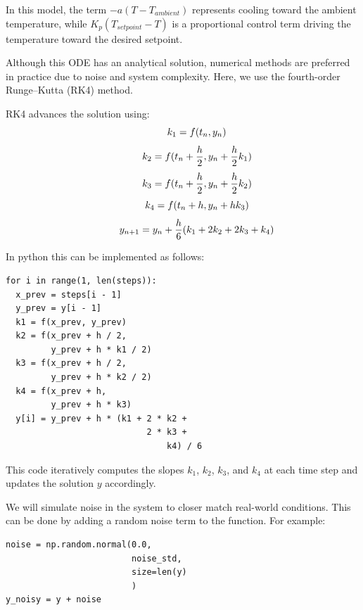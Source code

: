 \documentclass[letterpaper,twocolumn,fleqn]{article}
\begin{document}
In this model, the term $-a(T - T_{ambient})$ represents cooling toward the ambient temperature, while $K_{p}(T_{setpoint} - T)$ is a proportional control term driving the temperature toward the desired setpoint.
\vspace{0.1in}

\noindent Although this ODE has an analytical solution, numerical methods are preferred in practice due to noise and system complexity. Here, we use the fourth-order Runge–Kutta (RK4) method.
\vspace{0.1in}

\noindent RK4 advances the solution using: 
\[\hspace{0.4in}
k_1 = f(t_n, y_n)
\]
\[\hspace{0.4in}
k_2 = f(t_n + \frac{h}{2}, y_n + \frac{h}{2}k_1)
\]
\[\hspace{0.4in}
k_3 = f(t_n + \frac{h}{2}, y_n + \frac{h}{2}k_2)
\]
\[\hspace{0.4in}
k_4 = f(t_n + h, y_n + hk_3)
\]
\[\hspace{0.4in}
y_{n+1} = y_n + \frac{h}{6}(k_1 + 2k_2 + 2k_3 + k_4)
\]

\noindent In python this can be implemented as follows:
\begin{center}
\begin{minipage}{0.75\linewidth} %
\begin{verbatim}
for i in range(1, len(steps)):
  x_prev = steps[i - 1]
  y_prev = y[i - 1]
  k1 = f(x_prev, y_prev)
  k2 = f(x_prev + h / 2, 
         y_prev + h * k1 / 2)
  k3 = f(x_prev + h / 2, 
         y_prev + h * k2 / 2)
  k4 = f(x_prev + h, 
         y_prev + h * k3)
  y[i] = y_prev + h * (k1 + 2 * k2 + 
                            2 * k3 + 
                                k4) / 6
\end{verbatim}
\end{minipage}
\end{center}

\noindent This code iteratively computes the slopes $k_1$, $k_2$, $k_3$, and $k_4$ at each time step and updates the solution $y$ accordingly.
\vspace{0.1in}

\noindent We will simulate noise in the system to closer match real-world conditions. This can be done by adding a random noise term to the function. For example:

\begin{center}
\begin{minipage}{0.75\linewidth} %
\begin{verbatim}
noise = np.random.normal(0.0, 
                         noise_std, 
                         size=len(y)
                         )
y_noisy = y + noise
\end{verbatim}
\end{minipage}
\end{center}
\end{document}
